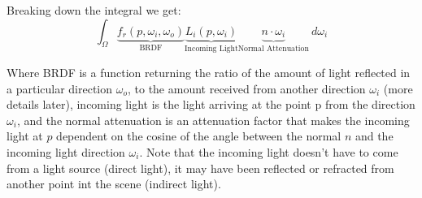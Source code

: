 Breaking down the integral we get:
\begin{equation}
\int_\Omega \underbrace{f_r(p,\omega_i,\omega_o)}_\text{BRDF}\underbrace{L_i(p,\omega_i)}_\text{Incoming Light}\underbrace{n\cdot\omega_i}_\text{Normal Attenuation}\ d\omega_i
\end{equation}

Where BRDF is a function returning the ratio of the amount of light reflected in a particular direction $\omega_o$, to the
amount received from another direction $\omega_i$ (more details later), incoming light is the light arriving at the point p
from the direction $\omega_i$, and the normal attenuation is an attenuation factor that makes the incoming light at $p$
dependent on the cosine of the angle between the normal $n$ and the incoming light direction $\omega_i$. Note that the
incoming light doesn't have to come from a light source (direct light), it may have been reflected or refracted from another
point int the scene (indirect light).
